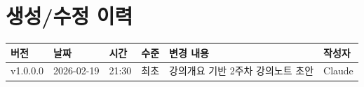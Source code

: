 \documentclass[11pt, a4paper]{article}
\begin{document}
\section*{생성/수정 이력}

\begin{table}[H]\centering
\begin{tabular}{llllll}\toprule
\textbf{버전} & \textbf{날짜} & \textbf{시간} & \textbf{수준} & \textbf{변경 내용} & \textbf{작성자} \\\midrule
v1.0.0.0 & 2026-02-19 & 21:30 & 최초 & 강의개요 기반 2주차 강의노트 초안 & Claude \\
\bottomrule
\end{tabular}
\end{table}
\end{document}
